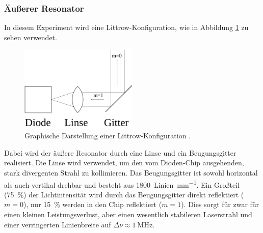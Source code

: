 \subsubsection{Äußerer Resonator}
In diesem Experiment wird eine Littrow-Konfiguration, wie in Abbildung \ref{Littrow}
zu sehen verwendet.
\begin{figure}[htb]
  \centering
  \includegraphics[width=0.5\textwidth]{images/Littrow-Konfig.pdf}
  \caption{Graphische Darstellung einer Littrow-Konfiguration \cite{Littrow-Konfig}.}
  \label{Littrow}
\end{figure}

Dabei wird der äußere Resonator durch eine Linse
und ein Beugungsgitter realisiert. Die Linse wird
verwendet, um den vom Dioden-Chip ausgehenden, stark divergenten Strahl zu
kollimieren. Das Beugungsgitter ist sowohl horizontal als auch vertikal drehbar
und besteht aus \SI{1800}{Linien\per\milli\meter}.
Ein Großteil (\SI{75}{\percent}) der Lichtintensität wird durch das Beugungsgitter
direkt reflektiert ($m=\num{0}$), nur \SI{15}{\percent} werden in den Chip reflektiert
($m=\num{1}$). Dies sorgt für zwar für einen kleinen Leistungsverlust, aber einen
wesentlich stabileren Laserstrahl und einer verringerten Linienbreite auf
$\Delta\nu\approx\SI{1}{\mega\hertz}$.



